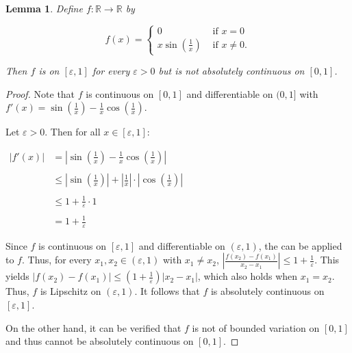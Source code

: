 \documentclass[12pt]{article}
\newtheorem*{lem*}{Lemma}
\begin{document}

\begin{lem*}
Define $f \colon \mathbb{R} \to \mathbb{R}$ by 

$$f(x)= \begin{cases}
0 & \text{ if } x=0 \\
\displaystyle x\sin\left( \frac{1}{x} \right) & \text{ if } x \neq 0. \end{cases}$$

Then $f$ is  on $[\varepsilon, 1]$ for every $\varepsilon >0$ but is not absolutely continuous on $[0,1]$.
\end{lem*}

\begin{proof}
Note that $f$ is continuous on $[0,1]$ and differentiable on $(0,1]$ with $\displaystyle f'(x)=\sin \left( \frac{1}{x} \right)-\frac{1}{x}\cos \left( \frac{1}{x} \right)$.

Let $\varepsilon >0$.  Then for all $x \in [\varepsilon ,1]$:

\begin{center}
$\begin{array}{ll}
|f'(x)| & \displaystyle =\left| \sin \left( \frac{1}{x} \right)-\frac{1}{x}\cos \left( \frac{1}{x} \right) \right| \\
\\
& \displaystyle \le \left| \sin \left( \frac{1}{x} \right) \right|+\left| \frac{1}{x} \right| \cdot \left| \cos \left( \frac{1}{x} \right) \right| \\
\\
& \displaystyle \le 1+\frac{1}{\varepsilon} \cdot 1 \\
\\
& \displaystyle =1+\frac{1}{\varepsilon} \end{array}$
\end{center}

Since $f$ is continuous on $[\varepsilon, 1]$ and differentiable on $(\varepsilon, 1)$, the  can be applied to $f$.  Thus, for every $x_1, x_2 \in (\varepsilon, 1)$ with $x_1 \neq x_2$, $\displaystyle \left| \frac{f(x_2)-f(x_1)}{x_2-x_1} \right| \le 1+\frac{1}{\varepsilon}$.  This yields $\displaystyle |f(x_2)-f(x_1)| \le \left( 1+\frac{1}{\varepsilon} \right) |x_2-x_1|$, which also holds when $x_1=x_2$.  Thus, $f$ is Lipschitz on $(\varepsilon, 1)$.  It follows that $f$ is absolutely continuous on $[\varepsilon, 1]$.

On the other hand, it can be verified that $f$ is not of bounded variation on $[0,1]$ and thus cannot be absolutely continuous on $[0,1]$.
\end{proof}
\end{document}
